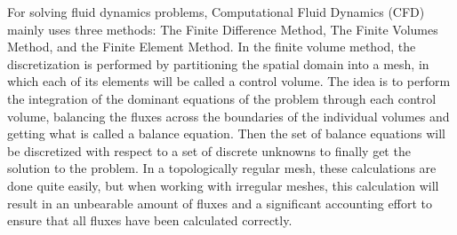 \documentclass[12pt,letterpaper]{article}
\begin{document}

For solving fluid dynamics problems, Computational Fluid Dynamics (CFD) mainly uses three methods: The Finite Difference Method, The Finite Volumes Method, and the Finite Element Method.  In the finite volume method, the discretization is performed by partitioning the spatial domain into a mesh, in which each of its elements will be called a control volume. The idea is to perform the integration of the dominant equations of the problem through each control volume, balancing the fluxes across the boundaries of the individual volumes and getting what is called a balance equation. Then the set of balance equations will be discretized with respect to a set of discrete unknowns to finally get the solution to the problem\cite{volumes}. In a topologically regular mesh, these calculations are done quite easily, but when working with irregular meshes, this calculation will result in an unbearable amount of fluxes and a significant accounting effort to ensure that all fluxes have been calculated correctly\cite{AutoDesk}.\\
\end{document}
